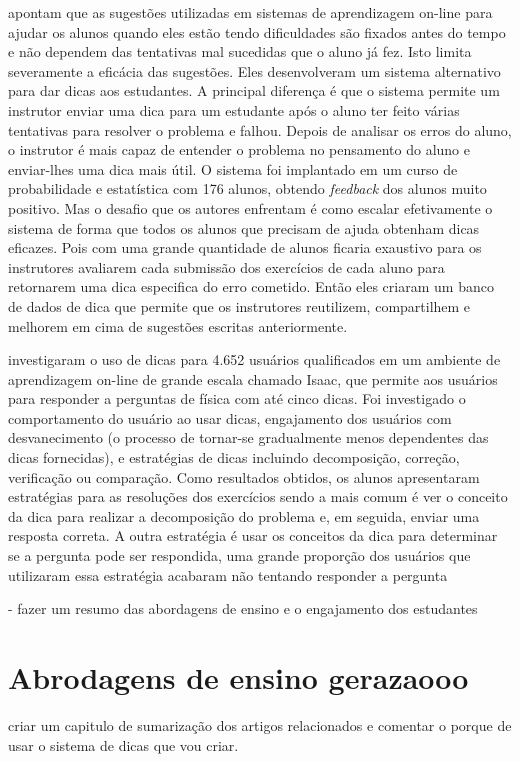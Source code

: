  apontam que as sugestões utilizadas em sistemas de aprendizagem on-line para ajudar os alunos quando eles estão tendo dificuldades são fixados antes do tempo e não dependem das tentativas mal sucedidas que o aluno já fez. Isto limita severamente a eficácia das sugestões. Eles desenvolveram um sistema alternativo para dar dicas aos estudantes. A principal diferença é que o sistema permite um instrutor enviar uma dica para um estudante após o aluno ter feito várias tentativas para resolver o problema e falhou. Depois de analisar os erros do aluno, o instrutor é mais capaz de entender o problema no pensamento do aluno e enviar-lhes uma dica mais útil. O sistema foi implantado em um curso de probabilidade e estatística com 176 alunos, obtendo \textit{feedback} dos alunos muito positivo. Mas o desafio que os autores enfrentam é como escalar efetivamente o sistema de forma que todos os alunos que precisam de ajuda obtenham dicas eficazes. Pois com uma grande quantidade de alunos ficaria exaustivo para os instrutores avaliarem cada submissão dos exercícios de cada aluno para retornarem uma dica especifica do erro cometido. Então eles criaram um banco de dados de dica que permite que os instrutores reutilizem, compartilhem e melhorem em cima de sugestões escritas anteriormente.

 investigaram  o uso de dicas para 4.652 usuários qualificados em um ambiente de aprendizagem on-line de grande escala chamado Isaac, que permite aos usuários para responder a perguntas de física com até cinco dicas. Foi investigado o comportamento do usuário ao usar dicas, engajamento dos usuários com desvanecimento (o processo de tornar-se gradualmente menos dependentes das dicas fornecidas), e estratégias de dicas incluindo decomposição, correção, verificação ou comparação. Como resultados obtidos, os alunos apresentaram estratégias para as resoluções dos exercícios sendo a mais comum é ver o conceito da dica para realizar a decomposição do problema e, em seguida, enviar uma resposta correta. A outra estratégia é usar os conceitos da dica para determinar se a pergunta pode ser respondida, uma grande proporção dos usuários que utilizaram essa estratégia acabaram não tentando responder a pergunta


- fazer um resumo das abordagens de ensino e o engajamento dos estudantes

\section{Abrodagens de ensino gerazaooo}


criar um capitulo de sumarização dos artigos relacionados e comentar o porque de usar o sistema de dicas que vou criar.